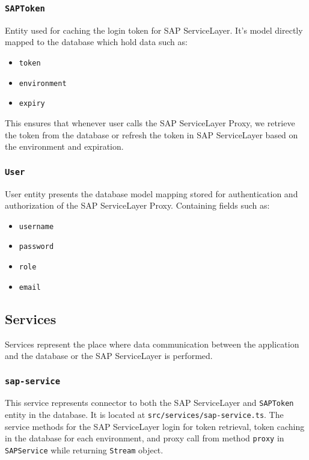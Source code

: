 \subsubsection{\texttt{SAPToken}}
Entity used for caching the login token for SAP ServiceLayer. 
It's model directly mapped to the database which hold data such as:
\begin{itemize}
    \item \texttt{token}
    \item \texttt{environment}
    \item \texttt{expiry}
\end{itemize}

This ensures that whenever user calls the SAP ServiceLayer Proxy, we retrieve the token from the database or refresh the token in SAP ServiceLayer based on the environment and expiration.


\subsubsection{\texttt{User}}
User entity presents the database model mapping stored for authentication and authorization of the SAP ServiceLayer Proxy.
Containing fields such as:
\begin{itemize}
    \item \texttt{username}
    \item \texttt{password}
    \item \texttt{role}
    \item \texttt{email}
\end{itemize}

\subsection{Services}
\label{attachments:programming-sap.overview.sevices}
Services represent the place where data communication between the application and the database or the SAP ServiceLayer is performed.

\subsubsection{\texttt{sap-service}}
This service represents connector to both the SAP ServiceLayer and \texttt{SAPToken} entity in the database.
It is located at \texttt{src/services/sap-service.ts}.
The service methods for the SAP ServiceLayer login for token retrieval, token caching in the database for each environment, and proxy call from method \texttt{proxy} in \texttt{SAPService} while returning \texttt{Stream} object.


